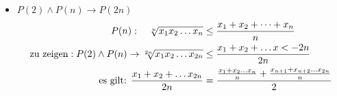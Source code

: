\begin{itemize}
\begin{proof}
\begin{equation}
\begin{aligned}
				&\Leftrightarrow \left(x_1x_2 \dots x_{n-1}\right)^{\frac{1}{n}} * \left(x_1x_2 \dots x_{n-1}\right)^{\frac{1}{n^2-n}} \\
				&\Leftrightarrow \left(x_1x_2 \dots x_{n-1}\right)^{\frac{1}{n} + \frac{1}{n^2-n}}\\
				&\Leftrightarrow \left(x_1x_2 \dots x_{n-1}\right)^{\frac{1}{n-1}} \\
				&\Leftrightarrow \sqrt[n-1]{x_1x_2 \dots x_{n-1}} = x_{n-1}\\
				\end{aligned}
			\end{equation}
			Damit gilt:  $\sqrt[n]{x_1x_2 \dots x_{n-1}*\sqrt[n-1]{x_1x_2 \dots x_{n-1}}} = \sqrt[n-1]{x_1x_2 \dots x_{n-1}}$ \\
			x_n einsetzen in Ungleichung  \\
			
			\begin{equation}
				\begin{aligned}
					\frac{x_1+x_2+ \dots +x_{n-1}+\sqrt[n-1]{x_1x_2 \dots x_{n-1}}}{n} &\geq \sqrt[n]{x_1x_2 \dots x_{n-1}*\sqrt[n-1]{x_1x_2 \dots x_{n-1}}} \quad |erstzen durch Term (s.o.)\notag \\
					\frac{x_1+x_2+ \dots +x_{n-1}+\sqrt[n-1]{x_1x_2 \dots x_{n-1}}}{n} &\geq  \sqrt[n-1]{x_1x_2 \dots x_{n-1}} \\
					\Leftrightarrow x_1+x_2+ \dots + x_{n-1}+\sqrt[n-1]{x_1x_2 \dots x_{n-1}} &\geq n*\sqrt[n-1]{x_1x_2 \dots x_{n-1}}	\\				
				    \Leftrightarrow x_1+x_2+ \dots + x_{n-1} &\geq n*\sqrt[n-1]{x_1x_2 \dots x_{n-1}} - \sqrt[n-1]{x_1x_2 \dots x_{n-1}} \\
				    \Leftrightarrow x_1+x_2+ \dots + x_{n-1} &\geq  \left(n-1\right)*	\sqrt[n-1]{x_1x_2 \dots x_{n-1}} \\
				    \Leftrightarrow \frac{x_1+x_2+ \dots + x_{n-1}}{n-1} &\geq \sqrt[n-1]{x_1x_2 \dots x_{n-1}} \Leftrightarrow P(n-1)\\				
				\end{aligned}
			\end{equation}
		\end{proof}
	\item $P(2) \wedge P(n) \rightarrow P(2n)$ \\
		 \begin{equation}
			\begin{aligned}
				P(n): \quad \sqrt[n]{x_1x_2 \dots x_n} &\leq \frac{x_1+x_2+ \dots + x_n}{n} \\
				\text{zu zeigen}:P(2) \wedge P(n) \rightarrow \sqrt[2n]{x_1x_2 \dots x_{2n}} &\leq \frac{x_1+x_2+ \dots x<-{2n}}{2n} \notag\\
				\text{es gilt: } \frac{x_1+x_2+ \dots x_{2n}}{2n} &= \frac{\frac{x_1+x_2 \dots x_n}{n} + \frac{x_{n+1}+x_{n+2} \dots x_{2n}}{n}}{2} \\
			\end{aligned}
	     \end{equation}
	     

\end{itemize}
